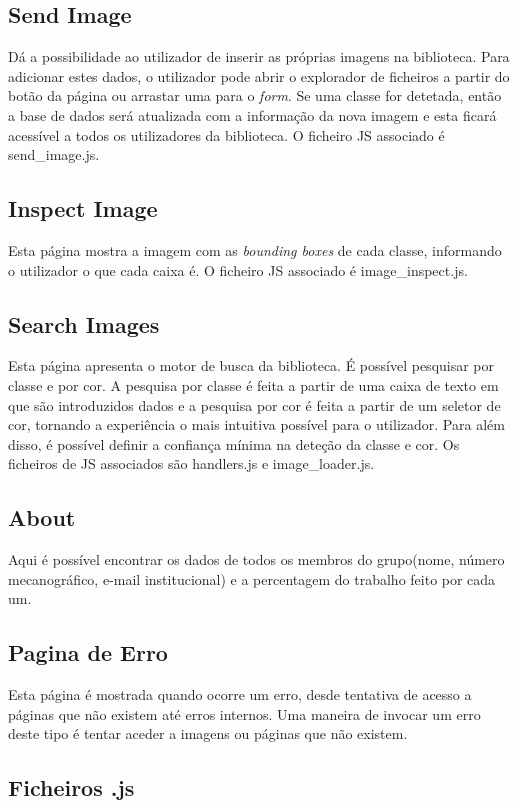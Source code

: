 \documentclass{report}
\begin{document}
\subsection{Send Image}
Dá a possibilidade ao utilizador de inserir as próprias imagens na biblioteca. Para adicionar estes dados, o utilizador pode abrir o explorador de ficheiros a partir do botão da página ou arrastar uma para o \textit{form}. Se uma classe for detetada, então a base de dados será atualizada com a informação da nova imagem e esta ficará acessível a todos os utilizadores da biblioteca. O ficheiro \ac{JS} associado é send\_image.js.

\subsection{Inspect Image}
Esta página mostra a imagem  com as \textit{bounding boxes} de cada classe, informando o utilizador o que cada caixa é. O ficheiro \ac{JS} associado é image\_inspect.js.

\subsection{Search Images}
Esta página apresenta o motor de busca da biblioteca. É possível pesquisar por classe e por cor. 
A pesquisa por classe é feita a partir de uma caixa de texto em que são introduzidos dados e a pesquisa por cor é feita a partir de um seletor de cor, tornando a experiência o mais intuitiva possível para o utilizador. Para além disso, é possível definir a confiança mínima na deteção da classe e cor. Os ficheiros de \ac{JS} associados são handlers.js e image\_loader.js.

\subsection{About}
Aqui é possível encontrar os dados de todos os membros do grupo(nome, número mecanográfico, e-mail institucional) e a percentagem do trabalho feito por cada um.

\subsection{Pagina de Erro}
Esta página é mostrada quando ocorre um erro, desde tentativa de acesso a páginas que não existem até erros internos.
Uma maneira de invocar um erro deste tipo é tentar aceder a imagens ou páginas que não existem. 


\subsection{Ficheiros .js}
\end{document}
